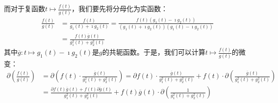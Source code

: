 \documentclass[12pt,UTF8]{ctexbook}
\begin{document}
而对于复函数$t\mapsto \frac{f(t)}{g(t)}$，我们要先将分母化为实函数：
\begin{align*}
    \frac{f(t)}{g(t)} &= \frac{f(t)}{g_1(t) + \imath g_2 (t)} = \frac{f(t)(g_1(t) - \imath g_2 (t))}{(g_1(t) + \imath g_2 (t))(g_1(t) - \imath g_2 (t))} \\
    &= \frac{f(t)\overline{g}(t)}{g_1^2(t) + g_2^2 (t)}
\end{align*}
其中$\overline{g}: t\mapsto g_1(t) - \imath g_2 (t)$是$g$的共轭函数。于是，我们可以计算$t\mapsto \frac{f(t)}{g(t)}$的微变：
\begin{align*}
    \partial \left(\frac{f(t)}{g(t)}\right) &= \partial \left(f(t) \cdot \frac{\overline{g}(t)}{g_1^2(t) + g_2^2 (t)}\right) = \partial f(t) \cdot \frac{\overline{g}(t)}{g_1^2(t) + g_2^2 (t)} + f(t) \cdot \partial \left(\frac{\overline{g}(t)}{g_1^2(t) + g_2^2 (t)}\right) \\
    &= \frac{\partial f(t)\overline{g}(t) + f(t) \partial \overline{g}(t)}{g_1^2(t) + g_2^2 (t)} + f(t) \overline{g}(t) \cdot \partial \left(\frac{1}{g_1^2(t) + g_2^2 (t)}\right) \\
%

\end{align*}
\end{document}
